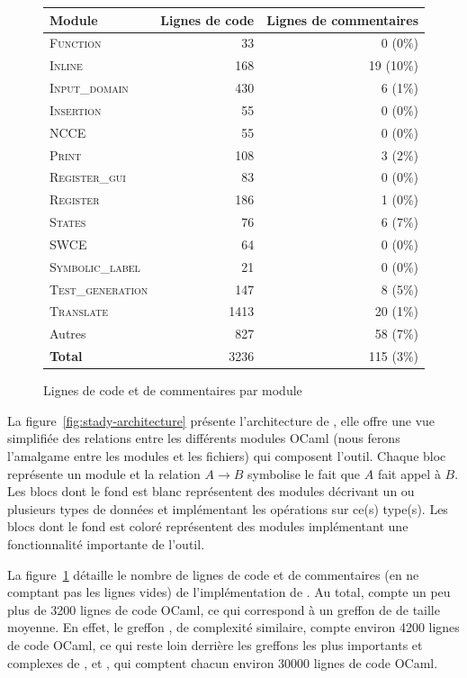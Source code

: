 \begin{figure}[tb]\scriptsize
  \begin{center}
    \begin{tabular}{lrr}
      \hline
      Module & Lignes de code & Lignes de commentaires \\
      \hline
      \textsc{Function} & 33 & 0 (0\%)\\
      \textsc{Inline} & 168 & 19 (10\%)\\
      \textsc{Input\_domain} & 430 & 6 (1\%)\\
      \textsc{Insertion} & 55 & 0 (0\%)\\
      \textsc{NCCE} & 55 & 0 (0\%)\\
      \textsc{Print} & 108 & 3 (2\%)\\
      \textsc{Register\_gui} & 83 & 0 (0\%)\\
      \textsc{Register} & 186 & 1 (0\%)\\
      \textsc{States} & 76 & 6 (7\%)\\
      \textsc{SWCE} & 64 & 0 (0\%)\\
      \textsc{Symbolic\_label} & 21 & 0 (0\%)\\
      \textsc{Test\_generation} & 147 & 8 (5\%)\\
      \textsc{Translate} & 1413 & 20 (1\%)\\
      Autres & 827 & 58 (7\%)\\
      \textbf{Total} & 3236 & 115 (3\%)\\ \hline
    \end{tabular}
  \end{center}
  \vspace{-3mm}
  \caption{Lignes de code et de commentaires par module}    
  \label{fig:stady-wc}
\end{figure}


La figure~\ref{fig:stady-architecture} présente l'architecture de \stady, elle
offre une vue simplifiée des relations entre les différents modules OCaml (nous
ferons l'amalgame entre les modules et les fichiers) qui composent l'outil.
Chaque bloc représente un module et la relation $A \rightarrow B$ symbolise le
fait que $A$ fait appel à $B$.
Les blocs dont le fond est blanc représentent des modules décrivant un ou
plusieurs types de données et implémentant les opérations sur ce(s) type(s).
Les blocs dont le fond est coloré représentent des modules implémentant une
fonctionnalité importante de l'outil.

La figure~\ref{fig:stady-wc} détaille le nombre de lignes de code et de
commentaires (en ne comptant pas les lignes vides) de l'implémentation de
\stady.
Au total, \stady compte un peu plus de 3200 lignes de code OCaml, ce qui
correspond à un greffon de \framac de taille moyenne.
En effet, le greffon \eacsltoc, de complexité similaire, compte environ 4200
lignes de code OCaml, ce qui reste loin derrière les greffons les plus
importants et complexes de \framac, \Value et \Wp, qui comptent chacun environ
30000 lignes de code OCaml.

